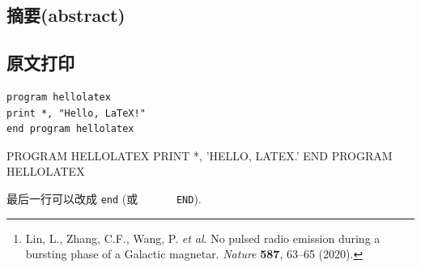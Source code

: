 \documentclass{ctexart}
\begin{document}
    \subsection{摘要(abstract)}
    \begin{abstract}
        Fast radio bursts (FRBs) are millisecond-duration radio transients of
        unknown physical origin observed at extragalactic distances. It has
        long been speculated that magnetars are the engine powering repeating
        bursts from FRB sources, but no convincing evidence has been collected
        so far. Recently, the Galactic magnetar SRG 1935+2154 entered an active
        phase by emitting intense soft $\gamma$-ray bursts. One FRB-like event
        with two peaks (FRB 200428) and a luminosity slightly lower than the
        faintest extragalactic FRBs was detected from the source, in
        association with a soft $\gamma$-ray/hard-X-ray flare. Here we report
        an eight-hour targeted radio observational campaign comprising four
        sessions and assisted by multi-wavelength (optical and hard-X-ray)
        data. During the third session, 29 soft-$\gamma$-ray repeater (SGR)
        bursts were detected in $\gamma$-ray energies. Throughout the observing
        period, we detected no single dispersed pulsed emission coincident with
        the arrivals of SGR bursts, but unfortunately we were not observing
        when the FRB was detected. The non-detection places a fluence upper
        limit that is eight orders of magnitude lower than the fluence of FRB
        200428. Our results suggest that FRB–SGR burst associations are rare.
        FRBs may be highly relativistic and geometrically beamed, or FRB-like
        events associated with SGR bursts may have narrow spectra and
        characteristic frequencies outside the observed band. It is also
        possible that the physical conditions required to achieve coherent
        radiation in SGR bursts are difficult to satisfy, and that only under
        extreme conditions could an FRB be associated with an SGR burst.\footnote{
            Lin, L., Zhang, C.F., Wang, P. \textit{et al}.
            No pulsed radio emission during a bursting phase of a Galactic magnetar.
            \textit{Nature} \textbf{587}, 63–65 (2020).}
    \end{abstract}
    \subsection{原文打印}
\begin{verbatim}
program hellolatex
print *, "Hello, LaTeX!"
end program hellolatex
\end{verbatim}
\begin{verbatim*}
      PROGRAM HELLOLATEX
      PRINT *, 'HELLO, LATEX.'
      END PROGRAM HELLOLATEX
\end{verbatim*}
    最后一行可以改成 \verb|end| (或 \verb*|      END|).
\end{document}

